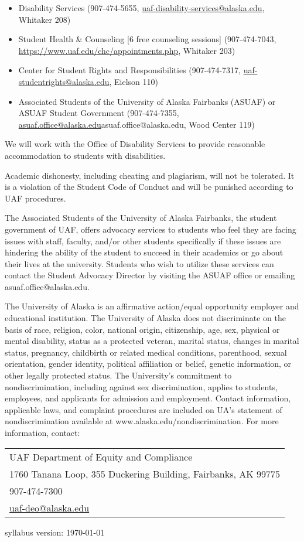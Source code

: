 \documentclass[12pt]{article}
\def\mailto#1{\href{mailto:#1}{#1}}
\begin{document}
\begin{itemize}
\setlength\itemsep{0em}
\item Disability Services (907-474-5655, \mailto{uaf-disability-services@alaska.edu}, Whitaker 208)
\item Student Health \& Counseling [6 free counseling sessions] (907-474-7043, \url{https://www.uaf.edu/chc/appointments.php}, Whitaker 203)
\item Center for Student Rights and Responsibilities (907-474-7317, \mailto{uaf-studentrights@alaska.edu}, Eielson 110)
\item Associated Students of the University of Alaska Fairbanks (ASUAF) or ASUAF Student Government (907-474-7355, \mailto{asuaf.office@alaska.edu}{asuaf.office@alaska.edu}, Wood Center 119)
\end{itemize}

 We will work with the Office of Disability Services to provide reasonable accommodation to students with disabilities.

Academic dishonesty, including cheating and plagiarism, will not
be tolerated.  It is a violation of the Student Code of Conduct
and will be punished according to UAF procedures.

 The Associated Students of the University of Alaska Fairbanks, the student government of UAF, offers advocacy services to students who feel they are facing issues with staff, faculty, and/or other students specifically if these issues are hindering the ability of the student to succeed in their academics or go about their lives at the university. Students who wish to utilize these services can contact the Student Advocacy Director by visiting the ASUAF office or emailing asuaf.office@alaska.edu.

The University of Alaska is an affirmative action/equal opportunity employer and educational institution. The University of Alaska does not discriminate on the basis of race, religion, color, national origin, citizenship, age, sex, physical or mental disability, status as a protected veteran, marital status, changes in marital status, pregnancy, childbirth or related medical conditions, parenthood, sexual orientation, gender identity, political affiliation or belief, genetic information, or other legally protected status. The University's commitment to nondiscrimination, including against sex discrimination, applies to students, employees, and applicants for admission and employment. Contact information, applicable laws, and complaint procedures are included on UA's statement of nondiscrimination available at www.alaska.edu/nondiscrimination. For more information, contact:

\begin{tabular}{l}
UAF Department of Equity and Compliance\\
1760 Tanana Loop, 355 Duckering Building, Fairbanks, AK  99775\\
907-474-7300\\
\mailto{uaf-deo@alaska.edu}
\end{tabular}

 \scriptsize syllabus version: \today \normalsize
\end{document}
